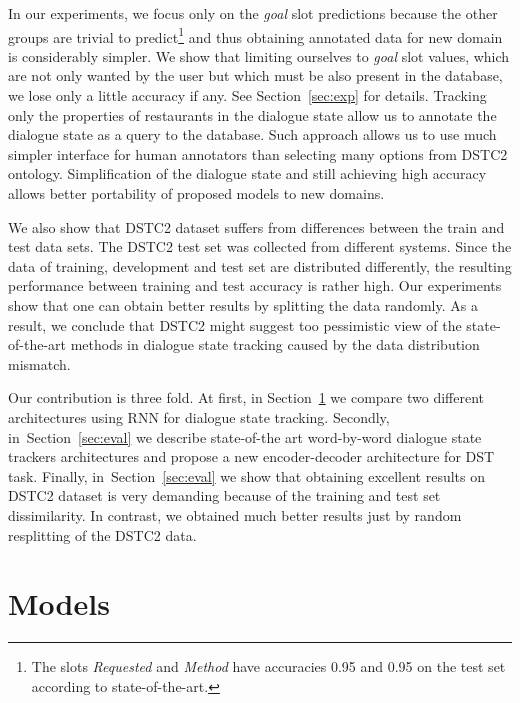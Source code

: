 \documentclass{itatnew}
\def\PB#1{\textcolor{red}{PB: \textit{#1}}}
\begin{document}
In our experiments, we focus only on the {\it goal} slot predictions because the other groups are trivial to predict\footnote{The slots {\it Requested} and {\it Method} have accuracies 0.95 and 0.95 on the test set according to state-of-the-art\cite{williams2014web}.} and thus obtaining annotated data for new domain is considerably simpler.
We show that limiting ourselves to {\it goal} slot values, which are not only wanted by the user but which must be also present in the database, we lose only a little accuracy if any.
See Section~\ref{sec:exp} for details.
Tracking only the properties of restaurants in the dialogue state allow us to annotate the dialogue state as a query to the database. Such approach allows us to use much simpler interface for human annotators than selecting many options from DSTC2 ontology.
Simplification of the dialogue state and still achieving high accuracy allows better portability of proposed models to new domains.

We also show that DSTC2 dataset suffers from differences between the train and test data sets.
The DSTC2 test set was collected from different systems\cite{henderson2014second}.
Since the data of training, development and test set are distributed differently, the resulting performance between training and test accuracy is rather high.
Our experiments show that one can obtain better results by splitting the data randomly.
As a result, we conclude that DSTC2 might suggest too pessimistic view of the state-of-the-art methods in dialogue state tracking caused by the data distribution mismatch.

Our contribution is three fold. 
At first, in Section~\ref{sec:model} we compare two different architectures using RNN for dialogue state tracking.
Secondly, in~Section~\ref{sec:eval} we describe state-of-the art word-by-word dialogue state trackers architectures and propose a new encoder-decoder architecture for DST task.
Finally, in~Section~\ref{sec:eval} we show that obtaining excellent results on DSTC2 dataset is very demanding because of the training and test set dissimilarity. In contrast, we obtained much better results just by random resplitting of the DSTC2 data.

\section{Models}
\label{sec:model}
\end{document}
